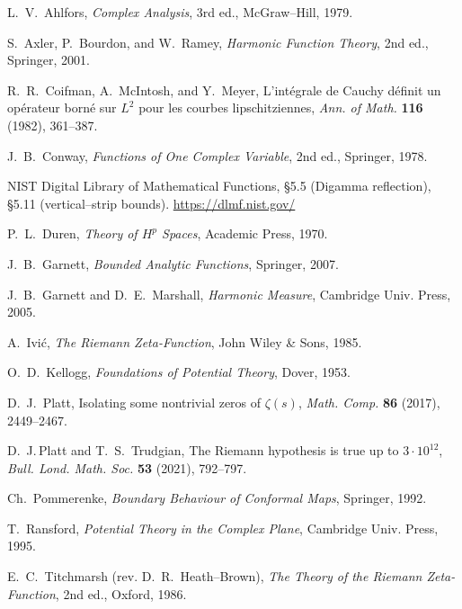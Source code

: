 \documentclass[11pt]{article}
\numberwithin{equation}{section}
\theoremstyle{remark}
\begin{document}

\begin{thebibliography}{99}

L.~V.~Ahlfors, \emph{Complex Analysis}, 3rd ed., McGraw--Hill, 1979.

S.~Axler, P.~Bourdon, and W.~Ramey, \emph{Harmonic Function Theory}, 2nd ed., Springer, 2001.

R.~R.~Coifman, A.~McIntosh, and Y.~Meyer,
L’int\'egrale de Cauchy d\'efinit un op\'erateur born\'e sur $L^2$ pour les courbes lipschitziennes,
\emph{Ann. of Math.} \textbf{116} (1982), 361--387.

J.~B.~Conway, \emph{Functions of One Complex Variable}, 2nd ed., Springer, 1978.

NIST Digital Library of Mathematical Functions, \S5.5 (Digamma reflection), \S5.11 (vertical--strip bounds).
\url{https://dlmf.nist.gov/}

P.~L.~Duren, \emph{Theory of $H^p$ Spaces}, Academic Press, 1970.

J.~B.~Garnett, \emph{Bounded Analytic Functions}, Springer, 2007.

J.~B.~Garnett and D.~E.~Marshall, \emph{Harmonic Measure}, Cambridge Univ. Press, 2005.

A.~Ivi\'c, \emph{The Riemann Zeta-Function}, John Wiley \& Sons, 1985.

O.~D.~Kellogg, \emph{Foundations of Potential Theory}, Dover, 1953.

D.~J.~Platt, Isolating some nontrivial zeros of $\zeta(s)$, \emph{Math. Comp.} \textbf{86} (2017), 2449–2467.

D.~J.\,Platt and T.~S.~Trudgian, The Riemann hypothesis is true up to $3\cdot 10^{12}$,
\emph{Bull. Lond. Math. Soc.} \textbf{53} (2021), 792–797.

Ch.~Pommerenke, \emph{Boundary Behaviour of Conformal Maps}, Springer, 1992.

T.~Ransford, \emph{Potential Theory in the Complex Plane}, Cambridge Univ. Press, 1995.

E.~C.~Titchmarsh (rev. D.~R.~Heath--Brown), \emph{The Theory of the Riemann Zeta-Function}, 2nd ed., Oxford, 1986.

\end{thebibliography}
\end{document}
